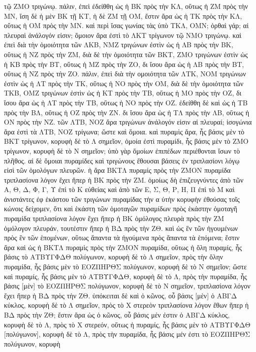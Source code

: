 \begin{Parallel}{}{}
{{τῷ ΖΜΟ τριγώνῳ. πάλιν, ἐπεὶ ἐδείθθη ὡς ἡ ΒΚ πρὸς τὴν ΚΛ,
οὕτως ἡ ΖΜ πρὸς τὴν ΜΝ, ἴση δὲ ἡ μὲν ΒΚ τῇ ΚΤ, ἡ δὲ ΖΜ τῇ
ΟΜ, ἔστιν ἄρα ὡς ἡ ΤΚ πρὸς τὴν ΚΛ, οὕτως ἡ ΟΜ πρὸς τὴν ΜΝ. καὶ
περὶ ἴσας γωνίας τὰς ὑπὸ ΤΚΛ, ΟΜΝ; ὀρθαὶ γάρ; αἱ πλευραὶ ἀνάλογόν
εἰσιν; ὅμοιον ἄρα ἐστὶ τὸ ΛΚΤ τρίγωνον τῷ ΝΜΟ τριγώνῳ. καὶ
ἐπεὶ διὰ τὴν ὁμοιότητα τῶν ΛΚΒ, ΝΜΖ τριγώνων ἐστὶν ὡς ἡ ΛΒ
πρὸς τὴν ΒΚ, οὕτως ἡ ΝΖ πρὸς τὴν ΖΜ, διὰ δὲ τὴν ὁμοιότητα τῶν 
ΒΚΤ,
ΖΜΟ τριγώνων ἐστὶν ὡς ἡ ΚΒ πρὸς τὴν ΒΤ, οὕτως ἡ ΜΖ πρὸς τὴν ΖΟ,
δι ἴσου ἄρα ὡς ἡ ΛΒ πρὸς τὴν ΒΤ, οὕτως ἡ ΝΖ πρὸς τὴν ΖΟ. πάλιν,
ἐπεὶ διὰ τὴν ομοιότητα τῶν ΛΤΚ, ΝΟΜ τριγώνων ἐστὶν ὡς ἡ ΛΤ πρὸς
τὴν ΤΚ, οὕτως ἡ ΝΟ πρὸς τὴν ΟΜ, διὰ δὲ τὴν ὁμοιότητα τῶν ΤΚΒ, ΟΜΖ
τριγώνων ἐστὶν ὡς ἡ ΚΤ πρὸς τὴν ΤΒ, οὕτως ἡ ΜΟ πρὸς τὴν ΟΖ, δι
ἴσου ἄρα ὡς ἡ ΛΤ πρὸς τὴν ΤΒ, οὕτως ἡ ΝΟ πρὸς τὴν ΟΖ. ἐδείθθη
δὲ καὶ ὡς ἡ ΤΒ πρὸς τὴν ΒΛ, οὕτως ἡ ΟΖ πρὸς τὴν ΖΝ. δι ἴσου
ἄρα ὡς ἡ ΤΛ πρὸς τὴν ΛΒ, οὕτως ἡ ΟΝ πρὸς τὴν ΝΖ. τῶν ΛΤΒ, ΝΟΖ
ἄρα τριγώνων ἀνάλογόν εἰσιν αἱ πλευραί; ἰσογώνια ἄρα ἐστὶ τὰ ΛΤΒ, ΝΟΖ
τρίγωνα; ὥστε καὶ ὅμοια. καὶ πυραμὶς ἄρα, ἧς βάσις μὲν τὸ ΒΚΤ τρίγωνον,
κορυφὴ δὲ τὸ Λ σημεῖον, ὁμοία ἐστὶ πυραμίδι, ἧς βάσις μὲν τὸ ΖΜΟ
τρίγωνον, κορυφὴ δὲ τὸ Ν σημεῖον; ὑπὸ γὰρ ὅμοίων ἐπιπέδων περιέθονται
ἴσων τὸ πλῆθος. αἱ δὲ ὅμοιαι πυραμίδες καὶ τριγώνους ἔθουσαι βάσεις
ἐν τριπλασίονι λόγῳ εἰσὶ τῶν ὁμολόγων πλευρῶν. ἡ ἄρα ΒΚΤΛ πυραμὶς
πρὸς τὴν ΖΜΟΝ πυραμίδα τριπλασίονα λόγον ἔχει ἤπερ ἡ ΒΚ πρὸς 
τὴν ΖΜ.
ὁμοίως δὴ ἐπιζευγνύντες ἀπὸ τῶν Α, Θ, Δ, Φ, Γ, Υ ἐπὶ τὸ Κ εὐθείας
καὶ ἀπὸ  τῶν Ε, Σ, Θ, Ρ, Η, Π ἐπὶ τὸ Μ καὶ ἀνιστάντες ἐφ ἑκάστου
τῶν τριγώνων πυραμίδας τὴν α ὐτὴν κορυφὴν ἐθούσας τοῖς κώνοις
δείχομεν, ὅτι καὶ ἑκάστη τῶν ὁμοταγῶν πυραμίδων πρὸς ἑκάστην ὁμοταγῆ
πυραμίδα τριπλασίονα λόγον ἕχει ἤπερ ἡ ΒΚ ὁμόλογος πλευρὰ πρὸς τὴν ΖΜ
ὁμόλογον πλευράν, τουτέστιν ἤπερ ἡ ΒΔ πρὸς τὴν ΖΘ. καὶ ὡς ἓν τῶν
ἡγουμένων πρὸς ἓν τῶν ἑπομένων, οὕτως ἅπαντα τὰ ἡγούμενα
πρὸς ἅπαντα τὰ ἑπόμενα; ἔστιν ἄρα καὶ ὡς ἡ ΒΚΤΛ πυραμὶς πρὸς
τὴν ΖΜΟΝ πυραμίδα, οὕτως ἡ ὅλη πυραμίς, ἧς βάσις τὸ ΑΤΒΥΓΦΔΘ πολύγωνον,
κορυφὴ δὲ τὸ Λ σημεῖον, πρὸς τὴν ὅλην πυραμίδα, ἧς βάσις μὲν τὸ ΕΟΖΠΗΡΘΣ πολύγωνον,
κορυφὴ δὲ τὸ Ν σημεῖον; ὥστε καὶ πυραμίς, ἧς βάσις μὲν τὸ ΑΤΒΥΓΦΔΘ, κορυφὴ
δὲ τὸ Λ, πρὸς τὴν πυραμίδα, ἧς βάσις [μὲν] τὸ ΕΟΖΠΗΡΘΣ πολύγωνον, κορυφὴ
δὲ τὸ Ν σημεῖον, τριπλασίονα λόγον ἔχει ἤπερ ἡ ΒΔ πρὸς τὴν ΖΘ. ὑπόκειται δὲ καὶ
ὁ κῶνος, οὗ βάσις [μὲν]
ὁ ΑΒΓΔ κύκλος, κορυφὴ δὲ τὸ Λ σημεῖον, πρὸς τὸ Χ στερεὸν τριπλασίονα λόγον ἔθων
ἤπερ ἡ ΒΔ πρὸς τὴν ΖΘ;  ἔστιν ἄρα ὡς ὁ κῶνος, οὗ βάσις μέν ἐστιν ὁ ΑΒΓΔ κύκλος,
κορυφὴ δὲ τὸ Λ, πρὸς τὸ Χ στερεόν, οὕτως ἡ πυραμίς, ἧς βάσις μὲν τὸ ΑΤΒΥΓΦΔΘ [πολύγωνον],
κορυφὴ δὲ τὸ Λ, πρὸς τὴν πυραμίδα, ἧς βάσις μέν ἐστι τὸ ΕΟΖΠΗΡΘΣ πολύγωνον, κορυφὴ
}}
\end{Parallel}
